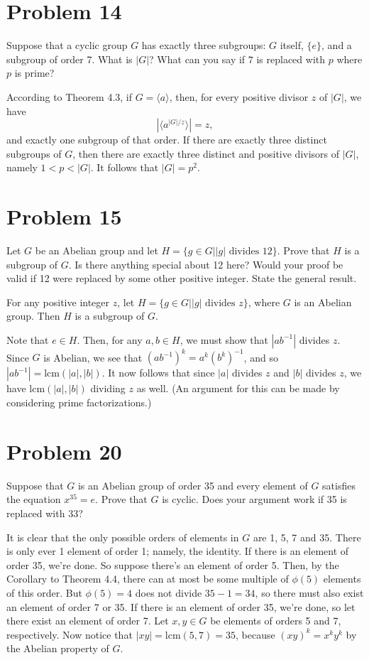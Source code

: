 \documentclass[12pt]{article}
\newcommand{\lcm}{\mbox{lcm}}
\begin{document}
\section*{Problem 14}

Suppose that a cyclic group $G$ has exactly three subgroups: $G$ itself,
$\{e\}$, and a subgroup of order 7.  What is $|G|$?  What can you say if $7$
is replaced with $p$ where $p$ is prime?

According to Theorem 4.3, if $G=\langle a\rangle$,
then, for every positive divisor $z$ of $|G|$, we have
\begin{equation*}
|\langle a^{|G|/z}\rangle|=z,
\end{equation*}
and exactly one subgroup of that order.  If there are exactly three distinct subgroups of $G$,
then there are exactly three distinct and positive divisors of $|G|$, namely $1<p<|G|$.
It follows that $|G|=p^2$.

\section*{Problem 15}

Let $G$ be an Abelian group and let $H=\{g\in G|\mbox{$|g|$ divides 12}\}$.  Prove
that $H$ is a subgroup of $G$.  Is there anything special about 12 here?
Would your proof be valid if 12 were replaced by some other positive integer.
State the general result.

For any positive integer $z$, let $H=\{g\in G|\mbox{$|g|$ divides $z$}\}$,
where $G$ is an Abelian group.  Then $H$ is a subgroup of $G$.

Note that $e\in H$.  Then, for any $a,b\in H$, we must show that $|ab^{-1}|$ divides $z$.
Since $G$ is Abelian, we see that $(ab^{-1})^k=a^k(b^k)^{-1}$, and so
$|ab^{-1}|=\lcm(|a|,|b|)$.  It now follows that since $|a|$ divides $z$ and $|b|$ divides $z$,
we have $\lcm(|a|,|b|)$ dividing $z$ as well.  (An argument for this can be made by considering
prime factorizations.)

\section*{Problem 20}

Suppose that $G$ is an Abelian group of order 35 and every element of $G$
satisfies the equation $x^{35}=e$.  Prove that $G$ is cyclic.  Does your argument
work if 35 is replaced with 33?

It is clear that the only possible orders of elements in $G$ are 1, 5, 7 and 35.
There is only ever 1 element of order 1; namely, the identity.
If there is an element of order 35, we're done.  So suppose there's an element of order 5.
Then, by the Corollary to Theorem 4.4, there can at most be some multiple of $\phi(5)$
elements of this order.  But $\phi(5)=4$ does not divide $35-1=34$, so there must
also exist an element of order 7 or 35.  If there is an element of order 35, we're done,
so let there exist an element of order 7.  Let $x,y\in G$ be elements of orders 5 and 7, respectively.
Now notice that $|xy|=\lcm(5,7)=35$, because $(xy)^k=x^ky^k$ by the Abelian property of $G$.
\end{document}
